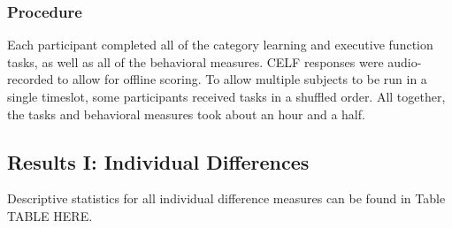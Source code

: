 \documentclass[../dissertation.tex]{subfiles}
\begin{document}
\subsubsection{Procedure}

Each participant completed all of the category learning and executive function tasks, as well as all of the behavioral measures. CELF responses were audio-recorded to allow for offline scoring. To allow multiple subjects to be run in a single timeslot, some participants received tasks in a shuffled order. All together, the tasks and behavioral measures took about an hour and a half.

\subsection{Results I: Individual Differences}

Descriptive statistics for all individual difference measures can be found in Table TABLE HERE.
\end{document}
